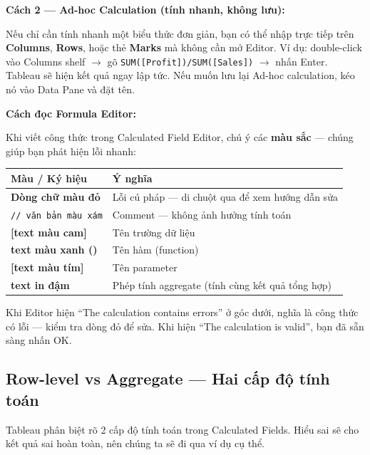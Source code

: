 \documentclass[12pt]{article}
\begin{document}
\noindent \textbf{Cách 2 --- Ad-hoc Calculation (tính nhanh, không lưu):}

\noindent Nếu chỉ cần tính nhanh một biểu thức đơn giản, bạn có thể nhập trực tiếp trên \textbf{Columns}, \textbf{Rows}, hoặc thẻ \textbf{Marks} mà không cần mở Editor. Ví dụ: double-click vào Columns shelf $\rightarrow$ gõ \texttt{SUM([Profit])/SUM([Sales])} $\rightarrow$ nhấn Enter. Tableau sẽ hiện kết quả ngay lập tức. Nếu muốn lưu lại Ad-hoc calculation, kéo nó vào Data Pane và đặt tên.

\noindent \textbf{Cách đọc Formula Editor:}

\noindent Khi viết công thức trong Calculated Field Editor, chú ý các \textbf{màu sắc} --- chúng giúp bạn phát hiện lỗi nhanh:

\begin{center}
\renewcommand{\arraystretch}{1.4}
\begin{tabularx}{\linewidth}{l X}
\toprule
\textbf{Màu / Ký hiệu} & \textbf{Ý nghĩa} \\
\midrule
\textbf{Dòng chữ màu đỏ} & Lỗi cú pháp --- di chuột qua để xem hướng dẫn sửa \\
\texttt{// văn bản màu xám} & Comment --- không ảnh hưởng tính toán \\
\textbf{[text màu cam]} & Tên trường dữ liệu \\
\textbf{text màu xanh ()} & Tên hàm (function) \\
\textbf{[text màu tím]} & Tên parameter \\
\textbf{text in đậm} & Phép tính aggregate (tính cùng kết quả tổng hợp) \\
\bottomrule
\end{tabularx}
\end{center}

\noindent Khi Editor hiện ``The calculation contains errors'' ở góc dưới, nghĩa là công thức có lỗi --- kiểm tra dòng đỏ để sửa. Khi hiện ``The calculation is valid'', bạn đã sẵn sàng nhấn OK.

\subsection{Row-level vs Aggregate --- Hai cấp độ tính toán}

\noindent Tableau phân biệt rõ 2 cấp độ tính toán trong Calculated Fields. Hiểu sai sẽ cho kết quả sai hoàn toàn, nên chúng ta sẽ đi qua ví dụ cụ thể.
\end{document}

